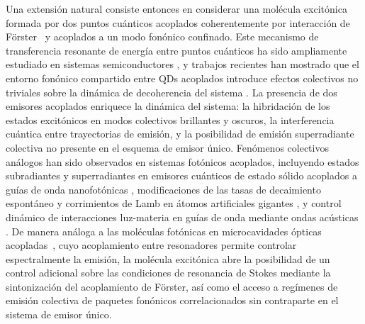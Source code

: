 Una extensión natural consiste entonces en considerar una molécula excitónica formada por dos puntos cuánticos acoplados coherentemente por interacción de Förster~\cite{forster1948} y acoplados a un modo fonónico confinado. Este mecanismo de transferencia resonante de energía entre puntos cuánticos ha sido ampliamente estudiado en sistemas semiconductores \cite{kagan1996,crooker2002}, y trabajos recientes han mostrado que el entorno fonónico compartido entre QDs acoplados introduce efectos colectivos no triviales sobre la dinámica de decoherencia del sistema \cite{hall2025}. La presencia de dos emisores acoplados enriquece la dinámica del sistema: la hibridación de los estados excitónicos en modos colectivos brillantes y oscuros, la interferencia cuántica entre trayectorias de emisión, y la posibilidad de emisión superradiante colectiva no presente en el esquema de emisor único. Fenómenos colectivos análogos han sido observados en sistemas fotónicos acoplados, incluyendo estados subradiantes y superradiantes en emisores cuánticos de estado sólido acoplados a guías de onda nanofotónicas \cite{tiranov2023}, modificaciones de las tasas de decaimiento espontáneo y corrimientos de Lamb en átomos artificiales gigantes \cite{kockum2014}, y control dinámico de interacciones luz-materia en guías de onda mediante ondas acústicas \cite{calajo2019}. De manera análoga a las moléculas fotónicas en microcavidades ópticas acopladas~\cite{boriskina2006}, cuyo acoplamiento entre resonadores permite controlar espectralmente la emisión, la molécula excitónica abre la posibilidad de un control adicional sobre las condiciones de resonancia de Stokes mediante la sintonización del acoplamiento de Förster, así como el acceso a regímenes de emisión colectiva de paquetes fonónicos correlacionados sin contraparte en el sistema de emisor único.\\

